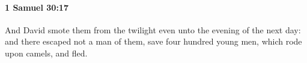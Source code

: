 
		\paragraph{1 Samuel 30:17} %
			\label{1SAMUEL-30-17}

			And David smote them from the twilight even unto the evening of the next day: and there escaped not a man of them, save four hundred young men, which rode upon camels, and fled.


